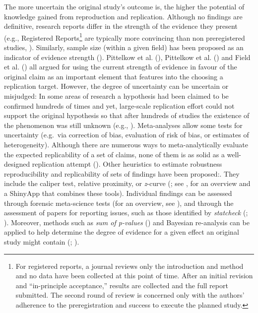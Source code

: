 \documentclass[
  letterpaper,
  DIV=11,
  openany,
  fontsize=12pt,
  parskip=half,
  headings=big,
  numbers=noenddot,
  titlepage=false]{scrreprt}
\begin{document}
The more uncertain the original study's outcome is, the higher the
potential of knowledge gained from reproduction and replication.
Although no findings are definitive, research reports differ in the
strength of the evidence they present (e.g., Registered
Reports\footnote{For registered reports, a journal reviews only the
  introduction and method and no data have been collected at this point
  of time. After an initial revision and ``in-principle acceptance,''
  results are collected and the full report submitted. The second round
  of review is concerned only with the authors' adherence to the
  preregistration and success to execute the planned study.} are
typically more convincing than non preregistered studies,
). Similarly,
sample size (within a given field) has been proposed as an indicator of
evidence strength (). Pittelkow et al.
(), Pittelkow et al.
() and Field et al.
() all argued for using the current
strength of evidence in favour of the original claim as an important
element that features into the choosing a replication target. However,
the degree of uncertainty can be uncertain or misjudged: In some areas
of research a hypothesis had been claimed to be confirmed hundreds of
times and yet, large-scale replication effort could not support the
original hypothesis so that after hundreds of studies the existence of
the phenomenon was still unknown (e.g.,
). Meta-analyses allow
some tests for uncertainty (e.g.~via correction of bias, evaluation of
risk of bias, or estimates of heterogeneity). Although there are
numerous ways to meta-analytically evaluate the expected replicability
of a set of claims, none of them is as solid as a well-designed
replication attempt ().
Other heuristics to estimate robustness reproducibility and
replicability of sets of findings have been proposed:. They include the
caliper test, relative proximity, or \emph{z}-curve
(; see
, for an
overview and a ShinyApp that combines these tools). Individual findings
can be assessed through forensic meta-science tests (for an overview,
see ), and through the
assessment of papers for reporting issues, such as those identified by
\emph{statcheck} (; ). Moreover,
methods such as \emph{sum of p-values}
() and
Bayesian re-analysis can be applied to help determine the degree of
evidence for a given effect an original study might contain
(;
).
\end{document}
